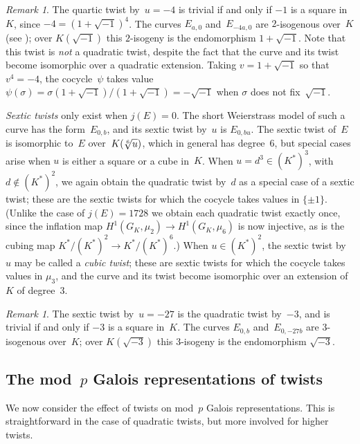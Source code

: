 \documentclass[12pt, reqno]{amsart}
\numberwithin{equation}{section}
\theoremstyle{definition}
\theoremstyle{remark}
\newtheorem{remark}[theorem]{Remark}
\begin{document}
\begin{remark}\label{R:2-isog}
The quartic twist by~$u=-4$ is trivial if and only if $-1$ is a square
in~$K$, since $-4=(1+\sqrt{-1})^4$.  The curves $E_{a,0}$
and~$E_{-4a,0}$ are $2$-isogenous over~$K$ (see
\cite[p. 336]{SilvermanI}); over $K(\sqrt{-1})$ this $2$-isogeny is
the endomorphism $1+\sqrt{-1}$.  Note that this twist is \emph{not} a
quadratic twist, despite the fact that the curve and its twist become
isomorphic over a quadratic extension.  Taking $v=1+\sqrt{-1}$ so that
$v^4=-4$, the cocycle~$\psi$ takes value
$\psi(\sigma)=\sigma(1+\sqrt{-1})/(1+\sqrt{-1})=-\sqrt{-1}$ when
$\sigma$ does not fix~$\sqrt{-1}$.
\end{remark}

\emph{Sextic twists} only exist when $j(E)=0$.  The short Weierstrass
model of such a curve has the form~$E_{0,b}$, and its sextic twist
by~$u$ is $E_{0,bu}$.  The sextic twist of~$E$ is isomorphic to~$E$
over~$K(\root6\of u)$, which in general has degree~$6$, but special
cases arise when $u$ is either a square or a cube in~$K$.  When
$u=d^3\in(K^*)^3$, with $d\notin(K^*)^2$, we again obtain the
quadratic twist by~$d$ as a special case of a sextic twist; these are
the sextic twists for which the cocycle takes values in $\{\pm1\}$.
(Unlike the case of $j(E)=1728$ we obtain each quadratic twist exactly
once, since the inflation map $H^1(G_K,\mu_2)\to H^1(G_K,\mu_6)$ is
now injective, as is the cubing map $K^*/(K^*)^2 \to K^*/(K^*)^6$.)
When $u\in(K^*)^2$, the sextic twist by~$u$ may be called a
\emph{cubic twist}; these are sextic twists for which the cocycle
takes values in $\mu_3$, and the curve and its twist become isomorphic
over an extension of~$K$ of degree~$3$.

\begin{remark}\label{R:3-isog}
The sextic twist by~$u=-27$ is the quadratic twist by~$-3$, and is
trivial if and only if $-3$ is a square in~$K$.  The curves $E_{0,b}$
and~$E_{0,-27b}$ are $3$-isogenous over~$K$; over $K(\sqrt{-3})$ this
$3$-isogeny is the endomorphism $\sqrt{-3}$.
\end{remark}


\subsection{The mod~$p$ Galois representations of twists}\label{SS:GalRepTwist}
We now consider the effect of twists on mod~$p$ Galois
representations.  This is straightforward in the case of quadratic
twists, but more involved for higher twists.
\end{document}
